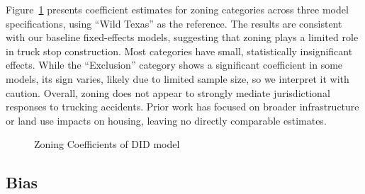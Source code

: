 \documentclass[
  12pt]{article}
\begin{document}
Figure~\ref{fig-DID_FE_categories} presents coefficient estimates for
zoning categories across three model specifications, using ``Wild
Texas'' as the reference. The results are consistent with our baseline
fixed-effects models, suggesting that zoning plays a limited role in
truck stop construction. Most categories have small, statistically
insignificant effects. While the ``Exclusion'' category shows a
significant coefficient in some models, its sign varies, likely due to
limited sample size, so we interpret it with caution. Overall, zoning
does not appear to strongly mediate jurisdictional responses to trucking
accidents. Prior work has focused on broader infrastructure or land use
impacts on housing, leaving no directly comparable estimates.

\begin{figure}


\caption{\label{fig-DID_FE_categories}Zoning Coefficients of DID model}

\end{figure}%

\subsection{Bias}\label{bias}
\end{document}

